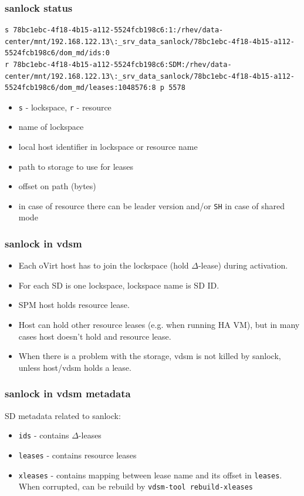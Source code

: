 \documentclass[10pt,utf8]{beamer}
\begin{document}
\begin{frame}[fragile]
    \frametitle{sanlock status}
    \begin{lstlisting}[style=log]
s 78bc1ebc-4f18-4b15-a112-5524fcb198c6:1:/rhev/data-center/mnt/192.168.122.13\:_srv_data_sanlock/78bc1ebc-4f18-4b15-a112-5524fcb198c6/dom_md/ids:0
r 78bc1ebc-4f18-4b15-a112-5524fcb198c6:SDM:/rhev/data-center/mnt/192.168.122.13\:_srv_data_sanlock/78bc1ebc-4f18-4b15-a112-5524fcb198c6/dom_md/leases:1048576:8 p 5578
    \end{lstlisting}
    
    \begin{itemize}
        \item \texttt{s} - lockspace, \texttt{r} - resource
        \item name of lockspace
        \item local host identifier in lockspace or resource name
        \item path to storage to use for leases
        \item offset on path (bytes)
        \item in case of resource there can be leader version and/or \texttt{SH} in case of shared mode
    \end{itemize}
\end{frame}

\begin{frame}
    \frametitle{sanlock in vdsm}
    \begin{itemize}
        \item Each oVirt host has to join the lockspace (hold $\Delta$-lease) during activation.
        \item For each SD is one lockspace, lockspace name is SD ID.
        \item SPM host holds resource lease.
        \item Host can hold other resource leases (e.g. when running HA VM), but in many cases host doesn't hold and resource lease.
        \item When there is a problem with the storage, vdsm is not killed by sanlock, unless host/vdsm holds a lease. %
    \end{itemize}
\end{frame}

\begin{frame}
    \frametitle{sanlock in vdsm metadata}
    SD metadata related to sanlock:
    \begin{itemize}
        \item \texttt{ids} - contains $\Delta$-leases
        \item \texttt{leases} - contains resource leases
        \item \texttt{xleases} - contains mapping between lease name and its offset in \texttt{leases}. When corrupted, can be rebuild by \texttt{vdsm-tool rebuild-xleases}
    \end{itemize}
\end{frame}
\end{document}
